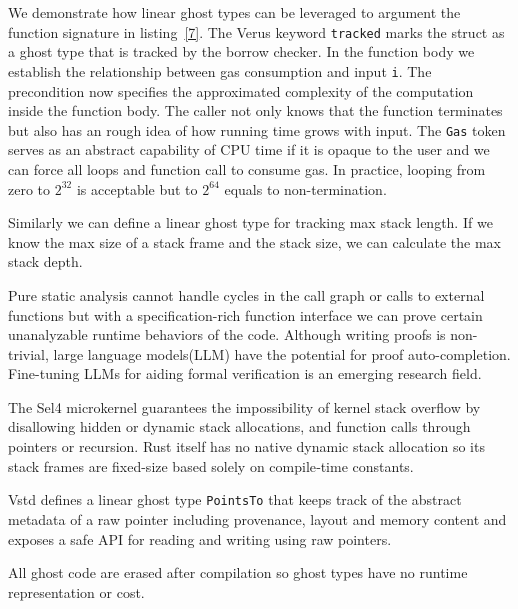 \documentclass[conference]{IEEEtran}
\begin{document}
We demonstrate how linear ghost types can be leveraged to argument the function signature in listing~\ref{7}. The Verus keyword \texttt{tracked} marks the struct as a ghost type that is tracked by the borrow checker. In the function body we establish the relationship between gas consumption and input \texttt{i}. The precondition now specifies the approximated complexity of the computation inside the function body. The caller not only knows that the function terminates but also has an rough idea of how running time grows with input. The \texttt{Gas} token serves as an abstract capability of CPU time if it is opaque to the user and we can force all loops and function call to consume gas. In practice, looping from zero to $2^{32}$ is acceptable but to $2^{64}$ equals to non-termination.      

Similarly we can define a linear ghost type for tracking max stack length. If we know the max size of a stack frame and the stack size, we can calculate the max stack depth. 

Pure static analysis cannot handle cycles in the call graph or calls to external functions but with a specification-rich function interface we can prove certain unanalyzable runtime behaviors of the code. Although writing proofs is non-trivial, large language models(LLM) have the potential for proof auto-completion. Fine-tuning LLMs for aiding formal verification\cite{chen2025automatedproofgenerationrust,shefer2025llmsenableverificationmainstream} is an emerging research field.  

The Sel4\cite{sel4} microkernel guarantees the impossibility of kernel stack overflow by disallowing hidden or dynamic stack allocations, and function calls through pointers or recursion. Rust itself has no native dynamic stack allocation so its stack frames are fixed-size based solely on compile‐time constants.


Vstd defines a linear ghost type \texttt{PointsTo} that keeps track of the abstract metadata of a raw pointer including provenance, layout and memory content and exposes a safe API for reading and writing using raw pointers.

All ghost code are erased after compilation so ghost types have no runtime representation or cost.



\end{document}
